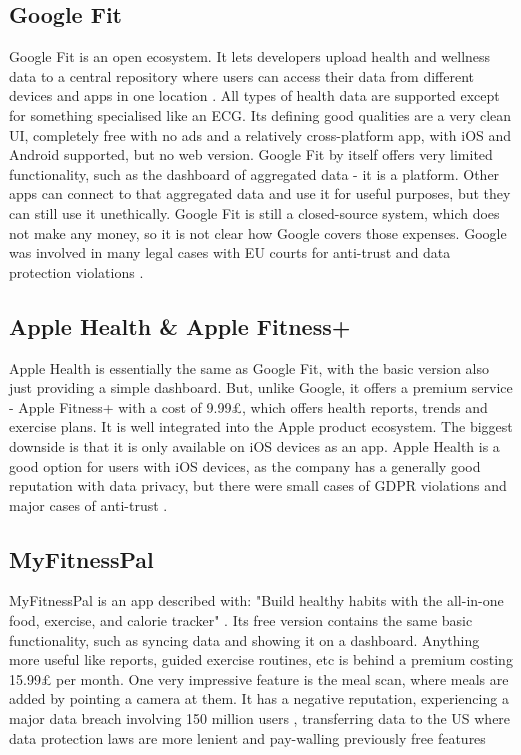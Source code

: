 \subsection{Google Fit}
Google Fit is an open ecosystem. It lets developers upload health and wellness data to a central repository where users can access their data from different devices and apps in one location \cite{googleFit}. All types of health data are supported except for something specialised like an ECG. Its defining good qualities are a very clean UI, completely free with no ads and a relatively cross-platform app, with iOS and Android supported, but no web version.  Google Fit by itself offers very limited functionality, such as the dashboard of aggregated data - it is a platform. Other apps can connect to that aggregated data and use it for useful purposes, but they can still use it unethically. Google Fit is still a closed-source system, which does not make any money, so it is not clear how Google covers those expenses. Google was involved in many legal cases with EU courts for anti-trust \cite{googleAntiTrust} and data protection violations \cite{googleDataProtect, googleDataProtect2}.
\subsection{Apple Health \& Apple Fitness+}
Apple Health is essentially the same as Google Fit, with the basic version also just providing a simple dashboard. But, unlike Google, it offers a premium service - Apple Fitness+ with a cost of 9.99£, which offers health reports, trends and exercise plans. It is well integrated into the Apple product ecosystem. The biggest downside is that it is only available on iOS devices as an app. Apple Health is a good option for users with iOS devices, as the company has a generally good reputation with data privacy, but there were small cases of GDPR violations \cite{CNILApple} and major cases of anti-trust \cite{appleAntiTrust}.
\subsection{MyFitnessPal}
MyFitnessPal is an app described with: "Build healthy habits with the all-in-one food, exercise, and calorie tracker" \cite{fitnesspal}. Its free version contains the same basic functionality, such as syncing data and showing it on a dashboard. Anything more useful like reports, guided exercise routines, etc is behind a premium costing 15.99£ per month. One very impressive feature is the meal scan, where meals are added by pointing a camera at them. It has a negative reputation, experiencing a major data breach involving 150 million users \cite{masuch2021fitness, myFitnessPalDataBreach}, transferring data to the US \cite{myfitnesspalTransferring} where data protection laws are more lenient and pay-walling previously free features \cite{myfitnesspalPaywall}

